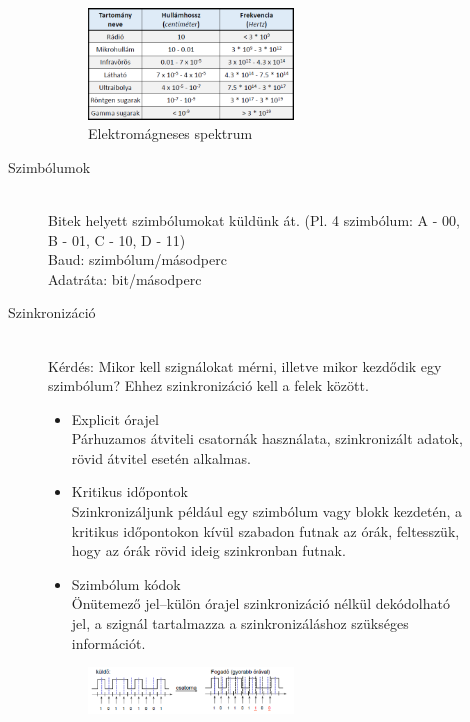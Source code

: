 \documentclass[margin=0px]{article}
\begin{document}
\begin{description}
\begin{description}
                \begin{figure}[H]
                    \centering
                    \includegraphics[width=0.6\textwidth]{img/elektromagneses.png}
                    \caption{Elektromágneses spektrum}
                \end{figure}
            \item[Szimbólumok] \hfill \\
                Bitek helyett szimbólumokat küldünk át. (Pl. 4 szimbólum: A - 00, B - 01, C - 10, D - 11)\\
                Baud: szimbólum/másodperc \\
                Adatráta: bit/másodperc
            \item[Szinkronizáció] \hfill \\
                Kérdés: Mikor kell szignálokat mérni, illetve mikor kezdődik egy szimbólum? Ehhez szinkronizáció kell a felek között.
                \begin{itemize}
                    \item Explicit órajel \\
                          Párhuzamos átviteli csatornák használata, szinkronizált adatok, rövid átvitel esetén alkalmas.
                    \item Kritikus időpontok \\
                          Szinkronizáljunk például egy szimbólum vagy blokk kezdetén, a kritikus időpontokon kívül szabadon futnak az órák, feltesszük, hogy az órák rövid ideig szinkronban futnak.
                    \item Szimbólum kódok \\
                          Önütemező jel–külön órajel szinkronizáció nélkül dekódolható jel, a szignál tartalmazza a szinkronizáláshoz szükséges információt.
                \end{itemize}
                \begin{figure}[H]
                    \centering
                    \includegraphics[width=0.6\textwidth]{img/szinkronizacio.png}

\end{figure}
\end{description}
\end{description}
\end{document}
